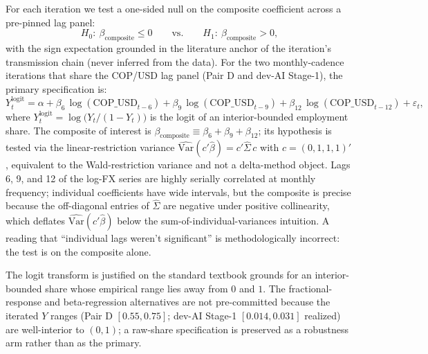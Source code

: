 For each iteration we test a one-sided null on the composite coefficient
across a pre-pinned lag panel:
\begin{equation}\label{eq:hypothesis}
H_0:\ \beta_{\mathrm{composite}} \leq 0
\qquad\mathrm{vs.}\qquad
H_1:\ \beta_{\mathrm{composite}} > 0,
\end{equation}
with the sign expectation grounded in the literature anchor of the
iteration's transmission chain (never inferred from the data). For the
two monthly-cadence iterations that share the COP/USD lag panel (Pair D
and dev-AI Stage-1), the primary specification is:
\begin{equation}\label{eq:primary-monthly}
Y_t^{\mathrm{logit}}
= \alpha
+ \beta_6\,\log(\mathrm{COP\_USD}_{t-6})
+ \beta_9\,\log(\mathrm{COP\_USD}_{t-9})
+ \beta_{12}\,\log(\mathrm{COP\_USD}_{t-12})
+ \varepsilon_t,
\end{equation}
where \(Y_t^{\mathrm{logit}} = \log\!\big(Y_t/(1-Y_t)\big)\) is the logit
of an interior-bounded employment share. The composite of interest is
\(\beta_{\mathrm{composite}} \equiv \beta_6 + \beta_9 + \beta_{12}\); its
hypothesis is tested via the linear-restriction variance
\(\widehat{\mathrm{Var}}(c'\hat{\beta}) = c'\widehat{\Sigma}\,c\) with
\(c = (0,1,1,1)'\), equivalent to the Wald-restriction variance and not a
delta-method object. Lags 6, 9, and 12 of the log-FX series are highly
serially correlated at monthly frequency; individual coefficients have
wide intervals, but the composite is precise because the off-diagonal
entries of \(\widehat{\Sigma}\) are negative under positive collinearity,
which deflates \(\widehat{\mathrm{Var}}(c'\hat{\beta})\) below the
sum-of-individual-variances intuition. A reading that ``individual lags
weren't significant'' is methodologically incorrect: the test is on the
composite alone.

The logit transform is justified on the standard textbook
\citep[\S 16.4]{hansen2022} grounds for an interior-bounded share whose
empirical range lies away from \(0\) and \(1\). The fractional-response
\citep{papkewooldridge1996} and beta-regression
\citep{ferraricribarineto2004} alternatives are not pre-committed because
the iterated \(Y\) ranges (Pair D \([0.55,0.75]\); dev-AI Stage-1
\([0.014,0.031]\) realized) are well-interior to \((0,1)\); a raw-share
specification is preserved as a robustness arm rather than as the primary.


